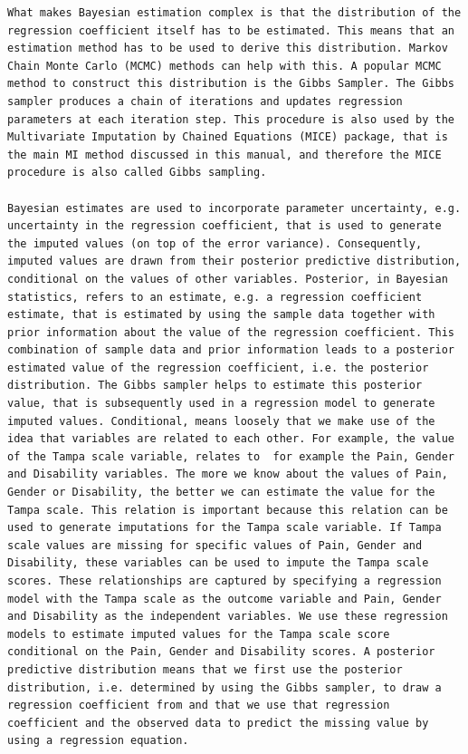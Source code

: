 \documentclass[]{book}
\begin{document}
\begin{verbatim}
What makes Bayesian estimation complex is that the distribution of the regression coefficient itself has to be estimated. This means that an estimation method has to be used to derive this distribution. Markov Chain Monte Carlo (MCMC) methods can help with this. A popular MCMC method to construct this distribution is the Gibbs Sampler. The Gibbs sampler produces a chain of iterations and updates regression parameters at each iteration step. This procedure is also used by the Multivariate Imputation by Chained Equations (MICE) package, that is the main MI method discussed in this manual, and therefore the MICE procedure is also called Gibbs sampling.

Bayesian estimates are used to incorporate parameter uncertainty, e.g. uncertainty in the regression coefficient, that is used to generate the imputed values (on top of the error variance). Consequently, imputed values are drawn from their posterior predictive distribution, conditional on the values of other variables. Posterior, in Bayesian statistics, refers to an estimate, e.g. a regression coefficient estimate, that is estimated by using the sample data together with prior information about the value of the regression coefficient. This combination of sample data and prior information leads to a posterior estimated value of the regression coefficient, i.e. the posterior distribution. The Gibbs sampler helps to estimate this posterior value, that is subsequently used in a regression model to generate imputed values. Conditional, means loosely that we make use of the idea that variables are related to each other. For example, the value of the Tampa scale variable, relates to  for example the Pain, Gender and Disability variables. The more we know about the values of Pain, Gender or Disability, the better we can estimate the value for the Tampa scale. This relation is important because this relation can be used to generate imputations for the Tampa scale variable. If Tampa scale values are missing for specific values of Pain, Gender and Disability, these variables can be used to impute the Tampa scale scores. These relationships are captured by specifying a regression model with the Tampa scale as the outcome variable and Pain, Gender and Disability as the independent variables. We use these regression models to estimate imputed values for the Tampa scale score conditional on the Pain, Gender and Disability scores. A posterior predictive distribution means that we first use the posterior distribution, i.e. determined by using the Gibbs sampler, to draw a regression coefficient from and that we use that regression coefficient and the observed data to predict the missing value by using a regression equation. 
\end{verbatim}
\end{document}
